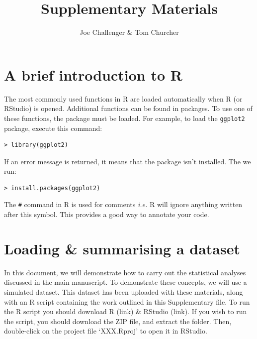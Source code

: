 \documentclass[11pt]{article}
\title{Supplementary Materials}
\author{Joe Challenger \& Tom Churcher}
\begin{document}
\maketitle

\section*{A brief introduction to R}

The most commonly used functions in R are loaded automatically when R (or RStudio) is opened. Additional functions can be found in packages. To use one of these functions, the package must be loaded. For example, to load the \verb+ggplot2+ package, execute this command:

\begin{verbatim}
> library(ggplot2)

\end{verbatim}
If an error message is returned, it means that the package isn't installed. The we run:

\begin{verbatim}
> install.packages(ggplot2)
\end{verbatim}

The \verb+#+ command in R is used for comments \textit{i.e.} R will ignore anything written after this symbol. This provides a good way to annotate your code.


\section{Loading \& summarising a dataset}

In this document, we will demonstrate how to carry out the statistical analyses discussed in the main manuscript. To demonstrate these concepts, we will use a simulated dataset. This dataset has been uploaded with these materials, along with an R script containing the work outlined in this Supplementary file. To run the R script you should download R (link) \& RStudio (link). If you wish to run the script, you should download the ZIP file, and extract the folder. Then, double-click on the project file `XXX.Rproj' to open it in RStudio.
\end{document}
